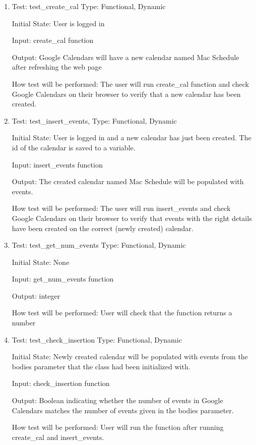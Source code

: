 \documentclass[12pt, titlepage]{article}
\begin{document}
\begin{enumerate}

\color{blue}\item{Test: test\_create_cal}
Type: Functional, Dynamic
					
Initial State: User is logged in
					
Input: create\_cal function
					
Output: Google Calendars will have a new calendar named Mac Schedule after refreshing the web page
					
How test will be performed: 
The user will run create\_cal function and check Google Calendars on their browser to verify that a new calendar has been created. 

\color{blue}\item{Test: test\_insert\_events,}
Type: Functional, Dynamic
					
Initial State: User is logged in and a new calendar has just been created. The id of the calendar is saved to a variable.
					
Input: insert\_events function
					
Output: The created calendar named Mac Schedule will be populated with events. 
					
How test will be performed: 
The user will run insert\_events and check Google Calendars on their browser to verify that events with the right details have been created on the correct (newly created) calendar. 
\color{blue}\item{Test: test\_get\_num\_events}
Type: Functional, Dynamic
					
Initial State: None
					
Input: get\_num\_events function
					
Output: integer
					
How test will be performed: 
User will check that the function returns a number

\color{blue}\item{Test: test\_check\_insertion}
Type: Functional, Dynamic
					
Initial State: Newly created calendar will be populated with events from the bodies parameter that the class had been initialized with.
					
Input: check\_insertion function
					
Output: Boolean indicating whether the number of events in Google Calendars matches the number of events given in the bodies parameter.
					
How test will be performed: 
User will run the function after running create\_cal and insert\_events.


\end{enumerate}
\end{document}
